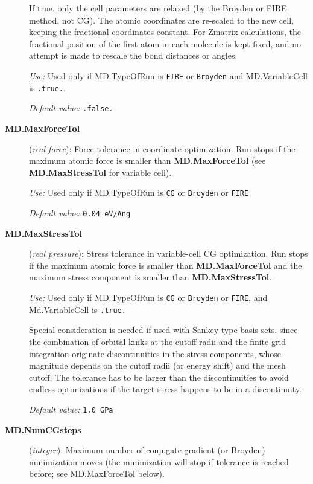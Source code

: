 \begin{description}
If true, only the cell parameters are relaxed (by the Broyden or FIRE
method, not CG).  The atomic coordinates are re-scaled to the new
cell, keeping the fractional coordinates constant. For Zmatrix
calculations, the fractional position of the first atom in each
molecule is kept fixed, and no attempt is made to rescale the bond
distances or angles.

\textit{Use:} Used only if MD.TypeOfRun is \texttt{FIRE} or \texttt{Broyden}  and
 MD.VariableCell is \texttt{.true.}.

\textit{Default value:} \texttt{.false.}

\item[\textbf{MD.MaxForceTol}] (\textit{real force}):
Force tolerance in coordinate optimization.
Run stops if the maximum atomic force is
smaller than \textbf{MD.MaxForceTol} (see \textbf{MD.MaxStressTol}
for variable cell).

\textit{Use:} Used only if MD.TypeOfRun is \texttt{CG} or \texttt{Broyden} or
\texttt{FIRE}

\textit{Default value:} \texttt{0.04 eV/Ang}


\item[\textbf{MD.MaxStressTol}] (\textit{real pressure}):
Stress tolerance in variable-cell CG optimization. Run stops
if the maximum atomic force is smaller than \textbf{MD.MaxForceTol}
and the maximum stress component is smaller than \textbf{MD.MaxStressTol}.

\textit{Use:} Used only if MD.TypeOfRun is \texttt{CG} or \texttt{Broyden} or
\texttt{FIRE}, and Md.VariableCell is \texttt{.true.}

Special consideration is needed if used with Sankey-type basis sets, since
the combination of orbital kinks at the cutoff radii and the finite-grid
integration originate discontinuities in the
stress components, whose magnitude depends on the cutoff radii (or
energy shift) and the mesh cutoff. The tolerance has to be larger
than the discontinuities to avoid endless optimizations if the target
stress happens to be in a discontinuity.

\textit{Default value:} \texttt{1.0 GPa}


\item[\textbf{MD.NumCGsteps}] (\textit{integer}):
Maximum number of conjugate gradient (or Broyden) minimization
moves (the minimization will stop
if tolerance is reached before; see MD.MaxForceTol below).


\end{description}

